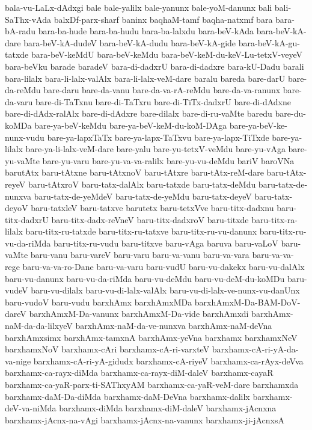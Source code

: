 {bala-vu-LaLx-dAdxgi
bale
bale-yalilx
bale-yanunx
bale-yoM-danunx
bali
bali-SaThx-vAda
balxDf-parx-sharf
baninx
baqhaM-tamf
baqha-natxmf
bara
bara-bA-radu
bara-ba-hude
bara-ba-hudu
bara-ba-lalxdu
bara-beV-kAda
bara-beV-kA-dare
bara-beV-kA-dudeV
bara-beV-kA-dudu
bara-beV-kA-gide
bara-beV-kA-gu-tatxde
bara-beV-keMdU
bara-beV-keMdu
bara-beV-keM-du-keV-Lu-tetxV-veyeV
bara-beVku
barade
baradeV
bara-di-dadxrU
bara-di-dadxre
bara-kU-Dadu
barali
bara-lilalx
bara-li-lalx-valAlx
bara-li-lalx-veM-dare
baralu
bareda
bare-darU
bare-da-reMdu
bare-daru
bare-da-vanu
bare-da-va-rA-reMdu
bare-da-va-ranunx
bare-da-varu
bare-di-TaTxnu
bare-di-TaTxru
bare-di-TiTx-dadxrU
bare-di-dAdxne
bare-di-dAdx-ralAlx
bare-di-dAdxre
bare-dilalx
bare-di-ru-vaMte
baredu
bare-du-koMDa
bare-ya-beV-keMdu
bare-ya-beV-keM-du-koM-DAga
bare-ya-beV-ke-nunx-vudu
bare-ya-lapxTaTx
bare-ya-lapx-TaTxvu
bare-ya-lapx-TiTxde
bare-ya-lilalx
bare-ya-li-lalx-veM-dare
bare-yalu
bare-yu-tetxV-veMdu
bare-yu-vAga
bare-yu-vaMte
bare-yu-varu
bare-yu-va-va-ralilx
bare-yu-vu-deMdu
bariV
baroVNa
barutAtx
baru-tAtxne
baru-tAtxnoV
baru-tAtxre
baru-tAtx-reM-dare
baru-tAtx-reyeV
baru-tAtxroV
baru-tatx-dalAlx
baru-tatxde
baru-tatx-deMdu
baru-tatx-de-nunxva
baru-tatx-de-yeMdeV
baru-tatx-de-yeMdu
baru-tatx-deyeV
baru-tatx-deyoV
baru-tatxleV
baru-tatxve
barutetx
baru-tetxVve
baru-titx-dadxnu
baru-titx-dadxrU
baru-titx-dadx-reVneV
baru-titx-dadxroV
baru-titxde
baru-titx-ra-lilalx
baru-titx-ru-tatxde
baru-titx-ru-tatxve
baru-titx-ru-vu-danunx
baru-titx-ru-vu-da-riMda
baru-titx-ru-vudu
baru-titxve
baru-vAga
baruva
baru-vaLoV
baru-vaMte
baru-vanu
baru-vareV
baru-varu
baru-va-vanu
baru-va-vara
baru-va-va-rege
baru-va-va-ro-Dane
baru-va-varu
baru-vudU
baru-vu-dakekx
baru-vu-dalAlx
baru-vu-danunx
baru-vu-da-riMda
baru-vu-deMdu
baru-vu-deM-du-koMDu
baru-vudeV
baru-vu-dilalx
baru-vu-di-lalx-valAlx
baru-vu-di-lalx-ve-nunx-vu-danUnx
baru-vudoV
baru-vudu
barxhAmx
barxhAmxMDa
barxhAmxM-Da-BAM-DoV-dareV
barxhAmxM-Da-vanunx
barxhAmxM-Da-vide
barxhAmxdi
barxhAmx-naM-da-da-lilxyeV
barxhAmx-naM-da-ve-nunxva
barxhAmx-naM-deVna
barxhAmxsimx
barxhAmx-tamxnA
barxhAmx-yeVna
barxhamx
barxhamxNeV
barxhamxNoV
barxhamx-cAri
barxhamx-cA-ri-varxteV
barxhamx-cA-ri-yA-da-va-nige
barxhamx-cA-ri-yA-gidudx
barxhamx-cA-riyeV
barxhamx-ca-rAyx-deVva
barxhamx-ca-rayx-diMda
barxhamx-ca-rayx-diM-daleV
barxhamx-cayaR
barxhamx-ca-yaR-parx-ti-SAThxyAM
barxhamx-ca-yaR-veM-dare
barxhamxda
barxhamx-daM-Da-diMda
barxhamx-daM-DeVna
barxhamx-dalilx
barxhamx-deV-va-niMda
barxhamx-diMda
barxhamx-diM-daleV
barxhamx-jAcnxna
barxhamx-jAcnx-na-vAgi
barxhamx-jAcnx-na-vanunx
barxhamx-ji-jAcnxsA
}
